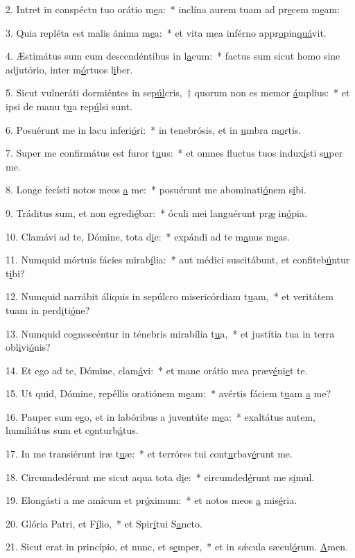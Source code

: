 2. Intret in conspéctu tuo orátio m\uline{e}a:~* inclína aurem tuam ad pr\uline{e}cem m\uline{e}am:\par 
3. Quia repléta est malis ánima m\uline{e}a:~* et vita mea inférno appr\uline{o}pin\uline{quá}vit.\par 
4. Æstimátus sum cum descendéntibus in l\uline{a}cum:~* factus sum sicut homo sine adjutório, inter m\uline{ó}rtuos l\uline{i}ber.\par 
5. Sicut vulneráti dormiéntes in se\uline{púl}cris,~† quorum non es memor \uline{á}mplius:~* et ipsi de manu t\uline{u}a rep\uline{ú}lsi sunt.\par 
6. Posuérunt me in lacu inferi\uline{ó}ri:~* in tenebrósis, et in \uline{u}mbra m\uline{o}rtis.\par 
7. Super me confirmátus est furor t\uline{u}us:~* et omnes fluctus tuos indux\uline{í}sti s\uline{u}per me.\par 
8. Longe fecísti notos meos \uline{a} me:~* posuérunt me abominati\uline{ó}nem s\uline{i}bi.\par 
9. Tráditus sum, et non egredi\uline{é}bar:~* óculi mei languérunt pr\uline{æ} in\uline{ó}pia.\par 
10. Clamávi ad te, Dómine, tota d\uline{i}e:~* expándi ad te m\uline{a}nus m\uline{e}as.\par 
11. Numquid mórtuis fácies mirab\uline{í}lia:~* aut médici suscitábunt, et confiteb\uline{ú}ntur t\uline{i}bi?\par 
12. Numquid narrábit áliquis in sepúlcro misericórdiam t\uline{u}am,~* et veritátem tuam in perd\uline{i}ti\uline{ó}ne?\par 
13. Numquid cognoscéntur in ténebris mirabília t\uline{u}a,~* et justítia tua in terra obl\uline{i}vi\uline{ó}nis?\par 
14. Et ego ad te, Dómine, clam\uline{á}vi:~* et mane orátio mea præv\uline{é}ni\uline{e}t te.\par 
15. Ut quid, Dómine, repéllis oratiónem m\uline{e}am:~* avértis fáciem t\uline{u}am \uline{a} me?\par 
16. Pauper sum ego, et in labóribus a juventúte m\uline{e}a:~* exaltátus autem, humiliátus sum et c\uline{o}nturb\uline{á}tus.\par 
17. In me transiérunt iræ t\uline{u}æ:~* et terróres tui cont\uline{u}rbav\uline{é}runt me.\par 
18. Circumdedérunt me sicut aqua tota d\uline{i}e:~* circumded\uline{é}runt me s\uline{i}mul.\par 
19. Elongásti a me amícum et pr\uline{ó}ximum:~* et notos meos \uline{a} mis\uline{é}ria.\par 
20. Glória Patri, et F\uline{í}lio,~* et Spir\uline{í}tui S\uline{a}ncto.\par 
21. Sicut erat in princípio, et nunc, et s\uline{e}mper,~* et in sǽcula sæcul\uline{ó}rum. \uline{A}men.\par 
